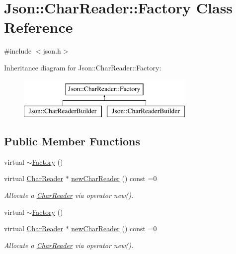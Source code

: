 \hypertarget{class_json_1_1_char_reader_1_1_factory}{}\section{Json\+:\+:Char\+Reader\+:\+:Factory Class Reference}
\label{class_json_1_1_char_reader_1_1_factory}


{\ttfamily \#include $<$json.\+h$>$}

Inheritance diagram for Json\+:\+:Char\+Reader\+:\+:Factory\+:\begin{figure}[H]
\begin{center}
\leavevmode
\includegraphics[height=2.000000cm]{class_json_1_1_char_reader_1_1_factory}
\end{center}
\end{figure}
\subsection*{Public Member Functions}
\begin{DoxyCompactItemize}
\item 
virtual \hyperlink{class_json_1_1_char_reader_1_1_factory_ae6938f632fa57f88e05818add5bc21be}{$\sim$\+Factory} ()
\item 
virtual \hyperlink{class_json_1_1_char_reader}{Char\+Reader} $\ast$ \hyperlink{class_json_1_1_char_reader_1_1_factory_a4c5862a1ffd432372dbe65cf59de98c4}{new\+Char\+Reader} () const =0
\begin{DoxyCompactList}\small\item\em Allocate a \hyperlink{class_json_1_1_char_reader}{Char\+Reader} via operator new(). \end{DoxyCompactList}\item 
virtual \hyperlink{class_json_1_1_char_reader_1_1_factory_ae6938f632fa57f88e05818add5bc21be}{$\sim$\+Factory} ()
\item 
virtual \hyperlink{class_json_1_1_char_reader}{Char\+Reader} $\ast$ \hyperlink{class_json_1_1_char_reader_1_1_factory_a4c5862a1ffd432372dbe65cf59de98c4}{new\+Char\+Reader} () const =0
\begin{DoxyCompactList}\small\item\em Allocate a \hyperlink{class_json_1_1_char_reader}{Char\+Reader} via operator new(). \end{DoxyCompactList}\end{DoxyCompactItemize}



